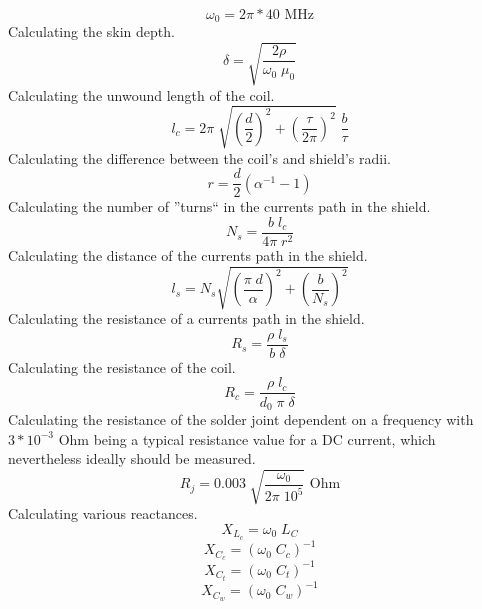 \begin{equation}
	\omega_0 = 2\pi * 40 \text{ MHz}
\end{equation}
Calculating the skin depth.
\begin{equation}
	\delta = \sqrt{\frac{2 \rho}{\omega_0 \; \mu_0}}
\end{equation}
Calculating the unwound length of the coil.
\begin{equation}
	l_c = 2\pi \; \sqrt{\left( \frac{d}{2} \right)^2 + \left( \frac{\tau}{2\pi} \right)^2} \; \frac{b}{\tau}
\end{equation}
Calculating the difference between the coil's and shield's radii.
\begin{equation}
	r = \frac{d}{2} \left( \alpha^{-1} - 1 \right)
\end{equation}
Calculating the number of ''turns`` in the currents path in the shield.
\begin{equation}
	N_s = \frac{b \; l_c}{4\pi \; r^2}
\end{equation}
Calculating the distance of the currents path in the shield.
\begin{equation}
	l_s = N_s \sqrt{\left( \frac{\pi \; d}{\alpha} \right)^2 + \left( \frac{b}{N_s} \right)^2}
\end{equation}
Calculating the resistance of a currents path in the shield.
\begin{equation}
	R_s = \frac{\rho \; l_s}{b \; \delta}
\end{equation}
Calculating the resistance of the coil.
\begin{equation}
	R_c = \frac{\rho \; l_c}{d_0 \; \pi \; \delta}
\end{equation}
Calculating the resistance of the solder joint dependent on a frequency with $3*10^{-3}$ Ohm being a typical resistance value for a DC current, which nevertheless ideally should be measured.
\begin{equation}
	R_j = 0.003 \; \sqrt{ \frac{\omega_0}{2\pi \; 10^5	} } \text{ Ohm}
\end{equation}
Calculating various reactances.
\begin{equation}
	X_{L_c} = \omega_0 \; L_C
\end{equation}
\begin{equation}
	X_{C_c} = \left( \omega_0 \; C_c \right)^{-1}
\end{equation}
\begin{equation}
	X_{C_t} = \left( \omega_0 \; C_t \right)^{-1}
\end{equation}
\begin{equation}
	X_{C_w} = \left( \omega_0 \; C_w \right)^{-1}
\end{equation}
